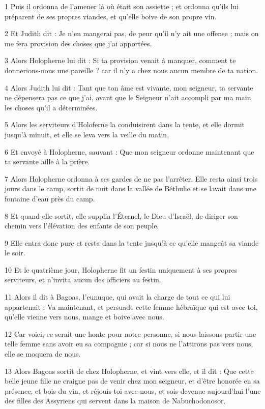 
\par 1 Puis il ordonna de l'amener là où était son assiette ; et ordonna qu'ils lui préparent de ses propres viandes, et qu'elle boive de son propre vin.
\par 2 Et Judith dit : Je n'en mangerai pas, de peur qu'il n'y ait une offense ; mais on me fera provision des choses que j'ai apportées.
\par 3 Alors Holopherne lui dit : Si ta provision venait à manquer, comment te donnerions-nous une pareille ? car il n'y a chez nous aucun membre de ta nation.
\par 4 Alors Judith lui dit : Tant que ton âme est vivante, mon seigneur, ta servante ne dépensera pas ce que j'ai, avant que le Seigneur n'ait accompli par ma main les choses qu'il a déterminées.
\par 5 Alors les serviteurs d'Holoferne la conduisirent dans la tente, et elle dormit jusqu'à minuit, et elle se leva vers la veille du matin,
\par 6 Et envoyé à Holopherne, sauvant : Que mon seigneur ordonne maintenant que ta servante aille à la prière.
\par 7 Alors Holopherne ordonna à ses gardes de ne pas l'arrêter. Elle resta ainsi trois jours dans le camp, sortit de nuit dans la vallée de Béthulie et se lavait dans une fontaine d'eau près du camp.
\par 8 Et quand elle sortit, elle supplia l'Éternel, le Dieu d'Israël, de diriger son chemin vers l'élévation des enfants de son peuple.
\par 9 Elle entra donc pure et resta dans la tente jusqu'à ce qu'elle mangeât sa viande le soir.
\par 10 Et le quatrième jour, Holopherne fit un festin uniquement à ses propres serviteurs, et n'invita aucun des officiers au festin.
\par 11 Alors il dit à Bagoas, l'eunuque, qui avait la charge de tout ce qui lui appartenait : Va maintenant, et persuade cette femme hébraïque qui est avec toi, qu'elle vienne vers nous, mange et boive avec nous.
\par 12 Car voici, ce serait une honte pour notre personne, si nous laissons partir une telle femme sans avoir eu sa compagnie ; car si nous ne l’attirons pas vers nous, elle se moquera de nous.
\par 13 Alors Bagoas sortit de chez Holopherne, et vint vers elle, et il dit : Que cette belle jeune fille ne craigne pas de venir chez mon seigneur, et d'être honorée en sa présence, et bois du vin, et réjouis-toi avec nous, et sois devenue aujourd'hui l'une des filles des Assyriens qui servent dans la maison de Nabuchodonosor.
